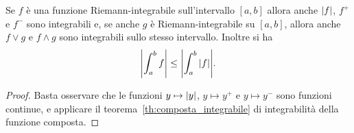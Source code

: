 \begin{theorem}%
  \label{th:reticolo}%
  Se $f$ è una funzione Riemann-integrabile sull'intervallo $[a,b]$ allora
  anche ${\left|f\right|}$, $f^+$ e $f^-$ sono integrabili e, se
  anche $g$ è Riemann-integrabile su $[a,b]$, allora anche $f\vee g$ e $f\wedge g$
  sono integrabili sullo stesso intervallo.
  Inoltre si ha 
  \begin{equation}\label{eq:489732}
    {\left|\int_a^b f\right|} 
    \le 
    {\left|\int_a^b {\left|f\right|}\right|}. 
  \end{equation}
  \end{theorem}
  \begin{proof}
  Basta osservare che le funzioni 
  $y\mapsto {\left|y\right|}$, $y\mapsto y^+$ e $y\mapsto y^-$ 
  sono funzioni continue, e applicare il teorema~\ref{th:composta_integrabile}
  di integrabilità della funzione composta.
  \end{proof}
